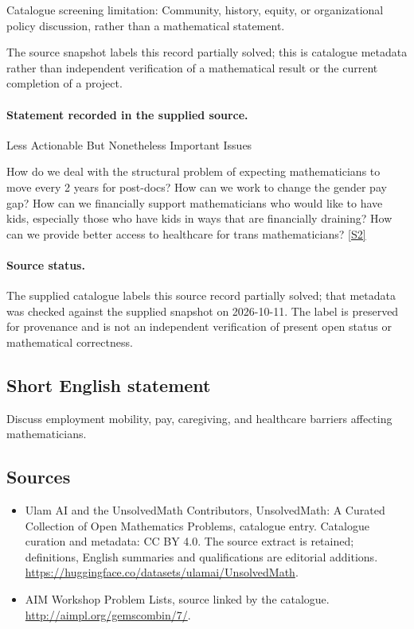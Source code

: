 \documentclass[11pt]{article}
\begin{document}
Catalogue screening limitation: Community, history, equity, or organizational policy discussion, rather than a mathematical statement.

The source snapshot labels this record partially solved; this is catalogue metadata rather than independent verification of a mathematical result or the current completion of a project.
\paragraph{Statement recorded in the supplied source.}
Less Actionable But Nonetheless Important Issues

How do we deal with the structural problem of expecting mathematicians to move every 2 years for post-docs? How can we work to change the gender pay gap? How can we financially support mathematicians who would like to have kids, especially those who have kids in ways that are financially draining? How can we provide better access to healthcare for trans mathematicians? \href{http://aimpl.org/gemscombin/7/}{[S2]}
\paragraph{Source status.}
The supplied catalogue labels this source record partially solved; that metadata was checked against the supplied snapshot on 2026-10-11. The label is preserved for provenance and is not an independent verification of present open status or mathematical correctness.
\subsection{Short English statement}
Discuss employment mobility, pay, caregiving, and healthcare barriers affecting mathematicians.
\subsection{Sources}
\begin{itemize}
\item[S1] Ulam AI and the UnsolvedMath Contributors, UnsolvedMath: A Curated Collection of Open Mathematics Problems, catalogue entry. Catalogue curation and metadata: CC BY 4.0. The source extract is retained; definitions, English summaries and qualifications are editorial additions.
\url{https://huggingface.co/datasets/ulamai/UnsolvedMath}.
\item[S2] AIM Workshop Problem Lists, source linked by the catalogue.
\url{http://aimpl.org/gemscombin/7/}.
\end{itemize}
\end{document}
